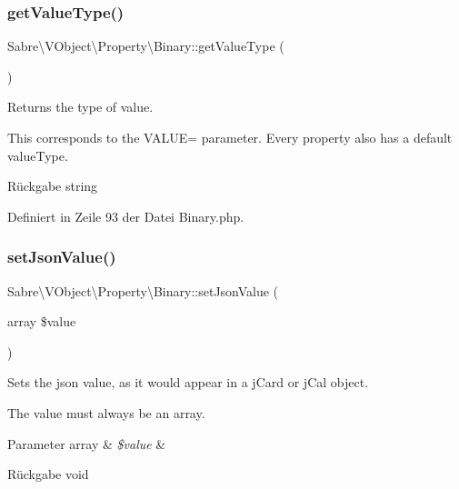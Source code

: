 \subsubsection{\texorpdfstring{get\+Value\+Type()}{getValueType()}}
{\footnotesize\ttfamily Sabre\textbackslash{}\+V\+Object\textbackslash{}\+Property\textbackslash{}\+Binary\+::get\+Value\+Type (\begin{DoxyParamCaption}{ }\end{DoxyParamCaption})}

Returns the type of value.

This corresponds to the V\+A\+L\+UE= parameter. Every property also has a \textquotesingle{}default\textquotesingle{} value\+Type.

\begin{DoxyReturn}{Rückgabe}
string 
\end{DoxyReturn}


Definiert in Zeile 93 der Datei Binary.\+php.

\mbox{\label{class_sabre_1_1_v_object_1_1_property_1_1_binary_a574fd72d52540ea0c8290cc116d9b8a6}} 
\subsubsection{\texorpdfstring{set\+Json\+Value()}{setJsonValue()}}
{\footnotesize\ttfamily Sabre\textbackslash{}\+V\+Object\textbackslash{}\+Property\textbackslash{}\+Binary\+::set\+Json\+Value (\begin{DoxyParamCaption}\item[{array}]{\$value }\end{DoxyParamCaption})}

Sets the json value, as it would appear in a j\+Card or j\+Cal object.

The value must always be an array.


\begin{DoxyParams}[1]{Parameter}
array & {\em \$value} & \\
\hline
\end{DoxyParams}
\begin{DoxyReturn}{Rückgabe}
void 
\end{DoxyReturn}


